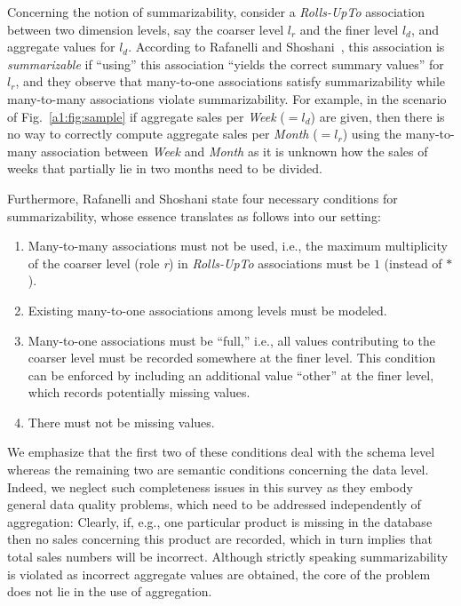Concerning the notion of summarizability, consider a
\emph{Rolls-UpTo} association between two dimension levels, say the
coarser level $l_r$ and the finer level $l_d$, and aggregate values
for $l_d$. According to Rafanelli and
Sho\-sha\-ni~\cite{DBLP:conf/ssdbm/RafanelliS90}, this association
is \emph{summarizable} if ``using'' this association ``yields the
correct summary values'' for $l_r$, and they observe that
many-to-one associations satisfy summarizability while many-to-many
associations violate summarizability.  For example, in the scenario
of Fig.~\ref{a1:fig:sample} if aggregate sales per \textit{Week}
($=l_d$) are given, then there is no way to correctly compute
aggregate sales per \textit{Month} ($=l_r$) using the many-to-many
association between \textit{Week} and \textit{Month} as it is
unknown how the sales of weeks that partially lie in two months need
to be divided.

Furthermore, Rafanelli and Shoshani state four necessary conditions
for summarizability, whose essence translates as follows into our
setting:
\begin{enumerate}
\item Many-to-many associations must not be used, i.e., the maximum
  multiplicity of the coarser level (role \emph{r}) in \emph{Rolls-UpTo} associations
  must be $1$ (instead of $*$).
\item Existing many-to-one associations among levels must be modeled.
\item Many-to-one associations must be ``full,'' i.e., all values contributing
  to the coarser level must be recorded somewhere at the finer level.
  This condition can be enforced by including an additional value ``other'' at
  the finer level, which records potentially missing values.
\item There must not be missing values.
\end{enumerate}
We emphasize that the first two of these conditions deal with the
schema level whereas the remaining two are semantic conditions
concerning the data level.  Indeed, we neglect such completeness
issues in this survey as they embody general data quality problems,
which need to be addressed independently of aggregation: Clearly,
if, e.g., one particular product is missing in the database then no
sales concerning this product are recorded, which in turn implies
that total sales numbers will be incorrect.  Although strictly
speaking summarizability is violated as incorrect aggregate values
are obtained, the core of the problem does not lie in the use of
aggregation.

